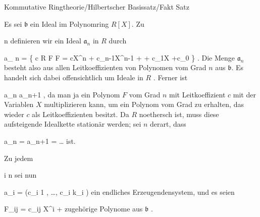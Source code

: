 {Kommutative Ringtheorie/Hilbertscher Basissatz/Fakt}
{Satz}
{}
{



\faktsituation {}
\faktzusatz {}
\faktzusatz {}




}
{




Es sei ${\mathfrak b}$ ein Ideal im Polynomring $R[X]$. Zu

\mavergleichskette
{\vergleichskette
{ n
}
{ \in }{ \N
}
{  }{
}
{    }{
}
{   }{
}
}
{}{}{}
definieren wir ein Ideal ${\mathfrak a}_n$ in $R$ durch

\mavergleichskettedisp
{\vergleichskette
{ {\mathfrak a}_ n
}
{ =} { \left\{  c \in R   \mid   {} F    F = cX^n + c_{n-1}X^{n-1} + \cdots + c_1X +c_0         \right\}
}
{ } {
}
{ } {
}
{ } {
}
}
{}{}{.}
Die Menge ${\mathfrak a}_n$ besteht also aus allen Leitkoeffizienten von Polynomen vom Grad $n$ aus ${\mathfrak b}$. Es handelt sich dabei offensichtlich um Ideale in $R$
 {} {.}
Ferner ist

\mavergleichskette
{\vergleichskette
{ {\mathfrak a}_n
}
{ \subseteq }{ {\mathfrak a}_{n+1}
}
{  }{
}
{    }{
}
{   }{
}
}
{}{}{,}
da man ja ein Polynom $F$ vom Grad $n$ mit Leitkoeffizient $c$ mit der Variablen $X$ multiplizieren kann, um ein Polynom vom Grad
 zu erhalten, das wieder $c$ als Leitkoeffizienten besitzt. Da $R$ noethersch ist, muss diese aufsteigende Idealkette stationär werden; sei $n$ derart, dass

\mavergleichskette
{\vergleichskette
{ {\mathfrak a}_n
}
{ = }{ {\mathfrak a}_{n+1}
}
{ = }{ \ldots
}
{    }{
}
{   }{
}
}
{}{}{}
ist.


Zu jedem

\mavergleichskette
{\vergleichskette
{ i
}
{ \leq }{ n
}
{  }{
}
{    }{
}
{   }{
}
}
{}{}{}
sei nun

\mavergleichskette
{\vergleichskette
{ {\mathfrak a}_i
}
{ = }{ (c_{i 1} , \ldots ,  c_{i k_i })
}
{  }{
}
{    }{
}
{   }{
}
}
{}{}{}
ein endliches Erzeugendensystem, und es seien

\mavergleichskettedisp
{\vergleichskette
{ F_{ij}
}
{ =} { c_{ij} X^{i} + 
}
{ } {
}
{ } {
}
{ } {
}
}
{}{}{}
zugehörige Polynome aus ${\mathfrak b}$
 {} {.}


}
